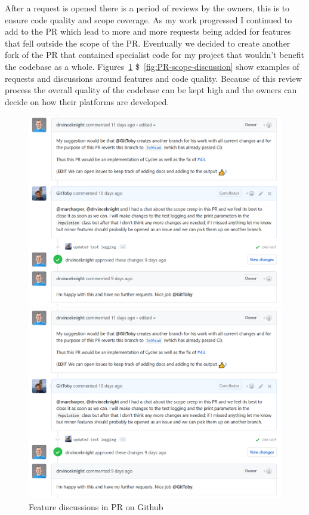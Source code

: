 After a request is opened there is a period of reviews by the owners, this is to ensure code quality and scope coverage. 
As my work progressed I continued to add to the PR which lead to more and more requests being added for features that fell outside the scope of the PR.
Eventually we decided to create another fork of the PR that contained specialist code for my project that wouldn't benefit the codebase as a whole.
Figures~\ref{fig:PR-discussion} \$~\ref{fig:PR-scope-discussion} show examples of requests and discussions around features and code quality.
Because of this review process the overall quality of the codebase can be kept high and the owners can decide on how their platforms are developed.

\begin{figure}[ht]
    \centering
    \begin{minipage}{0.48\textwidth}
        \centering
        \includegraphics[width=1.0\textwidth, center,keepaspectratio]{./img/vcs/scope-discussion.png}
        \caption{Feature discussions in PR on Github}\label{fig:PR-discussion}
    \end{minipage}\hfill
    \begin{minipage}{0.48\textwidth}
        \centering
        \includegraphics[width=1.0\textwidth, center,keepaspectratio]{./img/vcs/scope-discussion.png}    

\end{minipage}
\end{figure}

